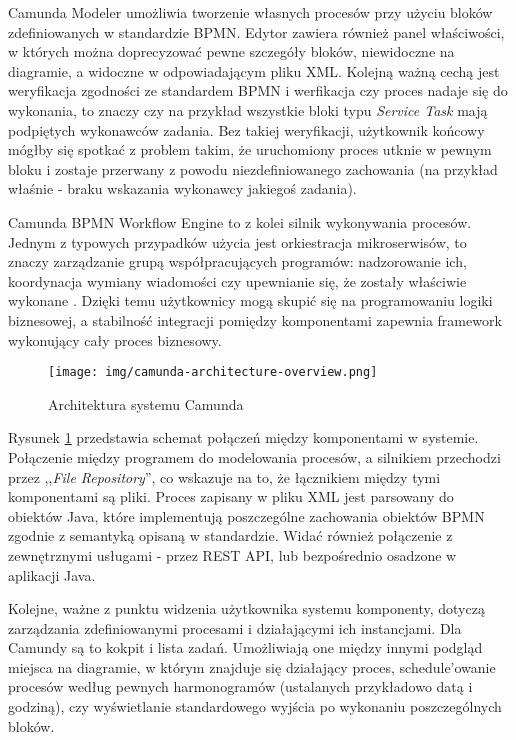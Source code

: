 \documentclass[declaration,shortabstract,mgr]{iithesis}
\newcommand{\bpmn}{BPMN }
\newcommand{\bpmnnospace}{BPMN}
\begin{document}
Camunda Modeler umożliwia tworzenie własnych procesów przy użyciu bloków zdefiniowanych w standardzie \bpmnnospace. Edytor zawiera również panel właściwości, w których można doprecyzować pewne szczegóły bloków, niewidoczne na diagramie, a widoczne w odpowiadającym pliku XML. Kolejną ważną cechą jest weryfikacja zgodności ze standardem \bpmn i werfikacja czy proces 
nadaje się do wykonania, to znaczy czy na przykład wszystkie bloki typu \textit{Service Task} mają podpiętych wykonawców zadania. Bez takiej weryfikacji, użytkownik końcowy mógłby się spotkać z problem takim, że uruchomiony proces utknie w pewnym bloku i zostaje przerwany z powodu niezdefiniowanego zachowania (na przykład właśnie - braku
wskazania wykonawcy jakiegoś zadania).

Camunda BPMN Workflow Engine to z kolei silnik wykonywania procesów. Jednym z typowych przypadków użycia jest orkiestracja mikroserwisów, to znaczy zarządzanie grupą współpracujących programów: nadzorowanie ich, koordynacja wymiany wiadomości czy upewnianie się, że zostały właściwie wykonane \cite{camunda-orchestration}. Dzięki temu użytkownicy mogą skupić się na programowaniu logiki biznesowej, a stabilność integracji pomiędzy komponentami zapewnia framework wykonujący cały proces biznesowy.

\begin{figure}
    \texttt{[image: img/camunda-architecture-overview.png]}
    \caption{Architektura systemu Camunda \cite{camunda-docs-introduction}}
    \label{fig:camunda-overview}
\end{figure}

Rysunek \ref{fig:camunda-overview} przedstawia schemat połączeń między komponentami w systemie. Połączenie między programem do modelowania procesów, a silnikiem przechodzi przez ,,\textit{File Repository}'', co wskazuje na to, że łącznikiem między tymi komponentami są pliki. Proces zapisany w pliku XML jest parsowany do obiektów Java, które implementują poszczególne zachowania obiektów \bpmn zgodnie z semantyką opisaną w standardzie. Widać również połączenie z zewnętrznymi usługami - przez REST API, lub bezpośrednio osadzone w aplikacji Java.

Kolejne, ważne z punktu widzenia użytkownika systemu komponenty, dotyczą zarządzania zdefiniowanymi procesami i działającymi ich instancjami. Dla Camundy są to kokpit i lista zadań. Umożliwiają one między innymi podgląd miejsca na diagramie, w którym znajduje się działający proces, schedule'owanie procesów według pewnych harmonogramów (ustalanych przykładowo datą i godziną), czy wyświetlanie standardowego wyjścia po wykonaniu poszczególnych bloków.
\end{document}
